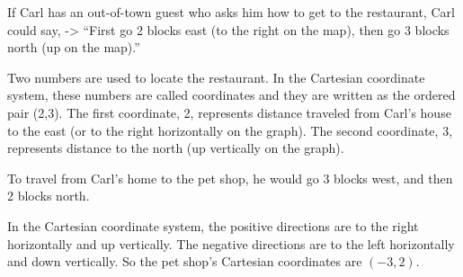 \documentclass{ximera}
\begin{document}
If Carl has an out-of-town guest who asks him how to get to the restaurant, Carl could say, -> ``First go 2 blocks east (to the right on the map), then go 3 blocks north (up on the map).''

Two numbers are used to locate the restaurant. In the Cartesian coordinate system, these numbers are called coordinates and they are written as the ordered pair (2,3). The first coordinate, 2, represents distance traveled from Carl's house to the east (or to the right horizontally on the graph). The second coordinate, 3, represents distance to the north (up vertically on the graph).

\begin{image}
\end{image}

To travel from Carl's home to the pet shop, he would go 3 blocks west, and then 2 blocks north.

In the Cartesian coordinate system, the positive directions are to the right horizontally and up vertically. The negative directions are to the left horizontally and down vertically. So the pet shop's Cartesian coordinates are $(-3,2)$.
\end{document}
